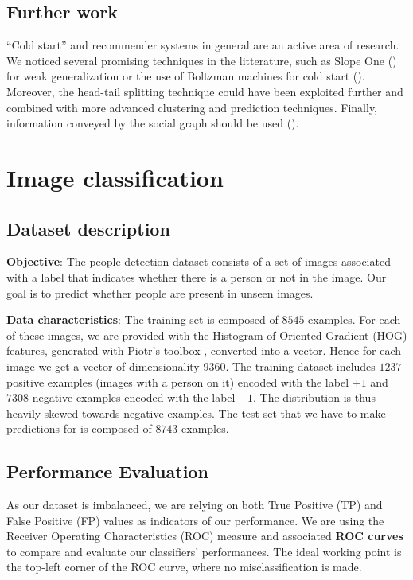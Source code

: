 \documentclass[10pt,a4paper]{article}
\begin{document}
  \subsection{Further work}
  ``Cold start'' and recommender systems in general are an active area of research. We noticed several promising techniques in the litterature, such as Slope One (\cite{slope-one}) for weak generalization or the use of Boltzman machines for cold start (\cite{cold-start-metrics}). Moreover, the head-tail splitting technique could have been exploited further and combined with more advanced clustering and prediction techniques. Finally, information conveyed by the social graph should be used (\cite{top-k-with-social-network}).

\section{Image classification}

  \subsection{Dataset description}
  \textbf{Objective}: The people detection dataset consists of a set of images associated with a label that indicates whether there is a person or not in the image. Our goal is to predict whether people are present in unseen images.

  \textbf{Data characteristics}: The training set is composed of $8545$ examples. For each of these images, we are provided with the Histogram of Oriented Gradient (HOG) features, generated with Piotr's toolbox \cite{piotrtoolbox}, converted into a vector. Hence for each image we get a vector of dimensionality $9360$. The training dataset includes $1237$ positive examples (images with a person on it) encoded with the label $+1$ and $7308$ negative examples encoded with the label $-1$. The distribution is thus heavily skewed towards negative examples. The test set that we have to make predictions for is composed of $8743$ examples. 

  \subsection{Performance Evaluation}
  As our dataset is imbalanced, we are relying on both True Positive (TP) and False Positive (FP) values as indicators of our performance. We are using the Receiver Operating Characteristics (ROC) measure and associated \textbf{ROC curves} \cite{rocanalysis} to compare and evaluate our classifiers' performances. The ideal working point is the top-left corner of the ROC curve, where no misclassification is made.
\end{document}
